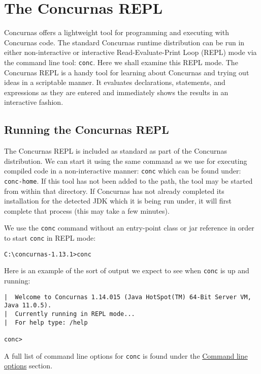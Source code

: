 \documentclass[conc-doc]{subfiles}
\begin{document}
	\chapter[The Concurnas REPL]{The Concurnas REPL}
	\label{ch:repl}

Concurnas offers a lightweight tool for programming and executing with Concurnas code. The standard Concurnas runtime distribution can be run in either non-interactive or interactive Read-Evaluate-Print Loop (REPL) mode via the command line tool: \lstinline[language=None]{conc}. Here we shall examine this REPL mode. The Concurnas REPL is a handy tool for learning about Concurnas and trying out ideas in a scriptable manner. It evaluates declarations, statements, and expressions as they are entered and immediately shows the results in an interactive fashion.	

\section{Running the Concurnas REPL}
The Concurnas REPL is included as standard as part of the Concurnas distribution. We can start it using the same command as we use for executing compiled code in a non-interactive manner: \lstinline[language=None]{conc} which can be found under: \lstinline[language=None]{conc-home}. If this tool has not been added to the path, the tool may be started from within that directory. If Concurnas has not already completed its installation for the detected JDK which it is being run under, it will first complete that process (this may take a few minutes).

We use the \lstinline[language=None]{conc} command without an entry-point class or jar reference in order to start \lstinline[language=None]{conc} in REPL mode:

\begin{lstlisting}[language=None]
C:\concurnas-1.13.1>conc
\end{lstlisting}

Here is an example of the sort of output we expect to see when \lstinline[language=None]{conc} is up and running:

\begin{lstlisting}[language=None]
|  Welcome to Concurnas 1.14.015 (Java HotSpot(TM) 64-Bit Server VM, Java 11.0.5).
|  Currently running in REPL mode...
|  For help type: /help

conc> 
\end{lstlisting}

A full list of command line options for \lstinline[language=None]{conc} is found under the \hyperref[sec:cmdlineparams]{Command line options} section.
\end{document}
